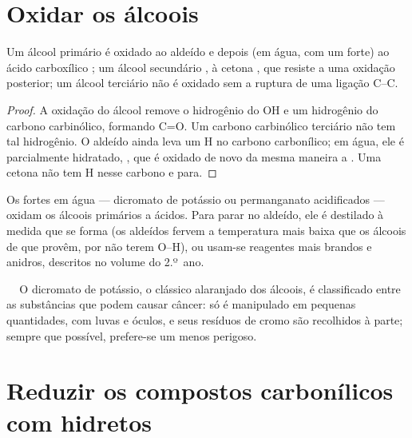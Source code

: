 \section{Oxidar os álcoois}

\begin{proposition}\label{prop:b1:organic-redox:alcohol-oxidation}
Um álcool primário  é oxidado ao aldeído  e depois
(em água, com um  forte) ao ácido carboxílico ; um
álcool secundário , à cetona , que resiste a uma
oxidação posterior; um álcool terciário  não é oxidado sem a
ruptura de uma ligação C--C.
\end{proposition}

\begin{proof}
A oxidação do álcool remove o hidrogênio do OH e um hidrogênio do
carbono carbinólico, formando C=O. Um carbono carbinólico terciário não
tem tal hidrogênio. O aldeído ainda leva um H no carbono carbonílico; em
água, ele é parcialmente hidratado, , que é oxidado de novo
da mesma maneira a . Uma cetona não tem H nesse carbono e para.
\end{proof}

Os  fortes em água --- dicromato de potássio ou permanganato
acidificados --- oxidam os álcoois primários a ácidos. Para parar no
aldeído, ele é destilado à medida que se forma (os aldeídos fervem a
temperatura mais baixa que os álcoois de que provêm, por não terem
 O--H), ou usam-se reagentes mais brandos e
anidros, descritos no volume do 2.º~ano.

\begin{safety}{\,\,\,\,\,}
O dicromato de potássio, o clássico  alaranjado dos álcoois, é
classificado entre as substâncias que podem causar câncer: só é
manipulado em pequenas quantidades, com luvas e óculos, e seus resíduos
de cromo são recolhidos à parte; sempre que possível, prefere-se um
 menos perigoso.
\end{safety}

\section{Reduzir os compostos carbonílicos com hidretos}

